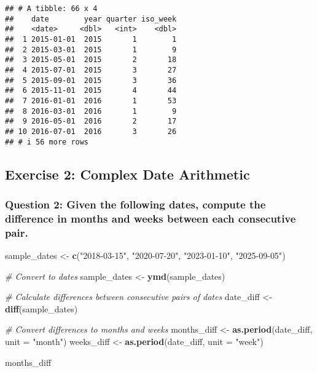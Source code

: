 \documentclass[
]{article}
\newenvironment{Shaded}{\begin{snugshade}}{\end{snugshade}}
\newcommand{\AttributeTok}[1]{\textcolor[rgb]{0.13,0.29,0.53}{#1}}
\newcommand{\CommentTok}[1]{\textcolor[rgb]{0.56,0.35,0.01}{\textit{#1}}}
\newcommand{\FunctionTok}[1]{\textcolor[rgb]{0.13,0.29,0.53}{\textbf{#1}}}
\newcommand{\NormalTok}[1]{#1}
\newcommand{\OtherTok}[1]{\textcolor[rgb]{0.56,0.35,0.01}{#1}}
\newcommand{\StringTok}[1]{\textcolor[rgb]{0.31,0.60,0.02}{#1}}
\begin{document}
\begin{verbatim}
## # A tibble: 66 x 4
##    date        year quarter iso_week
##    <date>     <dbl>   <int>    <dbl>
##  1 2015-01-01  2015       1        1
##  2 2015-03-01  2015       1        9
##  3 2015-05-01  2015       2       18
##  4 2015-07-01  2015       3       27
##  5 2015-09-01  2015       3       36
##  6 2015-11-01  2015       4       44
##  7 2016-01-01  2016       1       53
##  8 2016-03-01  2016       1        9
##  9 2016-05-01  2016       2       17
## 10 2016-07-01  2016       3       26
## # i 56 more rows
\end{verbatim}

\subsection{Exercise 2: Complex Date
Arithmetic}\label{exercise-2-complex-date-arithmetic}

\subsubsection{Question 2: Given the following dates, compute the
difference in months and weeks between each consecutive
pair.}\label{question-2-given-the-following-dates-compute-the-difference-in-months-and-weeks-between-each-consecutive-pair.}

\begin{Shaded}
\begin{Highlighting}[]
\NormalTok{sample\_dates }\OtherTok{\textless{}{-}} \FunctionTok{c}\NormalTok{(}\StringTok{"2018{-}03{-}15"}\NormalTok{, }\StringTok{"2020{-}07{-}20"}\NormalTok{, }\StringTok{"2023{-}01{-}10"}\NormalTok{, }\StringTok{"2025{-}09{-}05"}\NormalTok{)}

\CommentTok{\# Convert to dates}
\NormalTok{sample\_dates }\OtherTok{\textless{}{-}} \FunctionTok{ymd}\NormalTok{(sample\_dates)}

\CommentTok{\# Calculate differences between consecutive pairs of dates}
\NormalTok{date\_diff }\OtherTok{\textless{}{-}} \FunctionTok{diff}\NormalTok{(sample\_dates)}

\CommentTok{\# Convert differences to months and weeks}
\NormalTok{months\_diff }\OtherTok{\textless{}{-}} \FunctionTok{as.period}\NormalTok{(date\_diff, }\AttributeTok{unit =} \StringTok{"month"}\NormalTok{)}
\NormalTok{weeks\_diff }\OtherTok{\textless{}{-}} \FunctionTok{as.period}\NormalTok{(date\_diff, }\AttributeTok{unit =} \StringTok{"week"}\NormalTok{)}

\NormalTok{months\_diff}
\end{Highlighting}
\end{Shaded}
\end{document}
